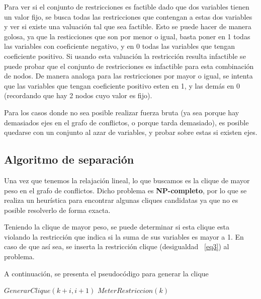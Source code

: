 Para ver si el conjunto de restricciones es factible dado que dos variables tienen un valor fijo, se busca
todas las restricciones que contengan a estas dos variables y ver si existe una valuaci\'on tal que sea factible. Esto se puede hacer de manera
golosa, ya que la resticciones que son por menor o igual, basta poner en 1 todas las variables con coeficiente negativo, y en 0 todas las variables que tengan coeficiente positivo. Si usando
esta valuaci\'on la restricci\'on resulta infactible se puede probar que el conjunto de restricciones es infactible para esta combinaci\'on de nodos. De manera analoga para las restricciones
 por mayor o igual, se intenta que las variables que tengan coeficiente positivo esten en 1, y las dem\'as en 0 (recordando que hay 2 nodos cuyo valor es fijo).

Para los casos donde no sea posible realizar fuerza bruta (ya sea porque hay demasiados ejes en el grafo de conflictos, o porque tarda demasiado),
es posible quedarse  con un conjunto al azar de variables, y probar sobre estas si existen ejes.

\bigskip
\subsection{Algoritmo de separaci\'on}

Una vez que tenemos la relajaci\'on lineal, lo que buscamos es la clique de mayor peso en el grafo de conflictos. Dicho problema es {\bf NP-completo},
por lo que se realiza un heur\'istica para encontrar algunas cliques candidatas ya que no es posible resolverlo de forma exacta. 

Teniendo la clique de mayor peso, se puede determinar si esta clique esta violando la restricci\'on que indica si la suma de sus variables es mayor a 1. En caso 
de que as\'i sea, se inserta la restricci\'on clique (desigualdad ~\ref{eq3}) al problema.


A continuaci\'on, se presenta el pseudoc\'odigo para generar la clique
\newpage 

\begin{algorithmic}
\label{algo3}
 
     \State $GenerarClique(k+i,i+1)$ 
    \EndIf
  \EndFor
     $MeterRestriccion(k)$
     \EndIf
  \EndIf
\EndFunction
\end{algorithmic}
\bigskip

